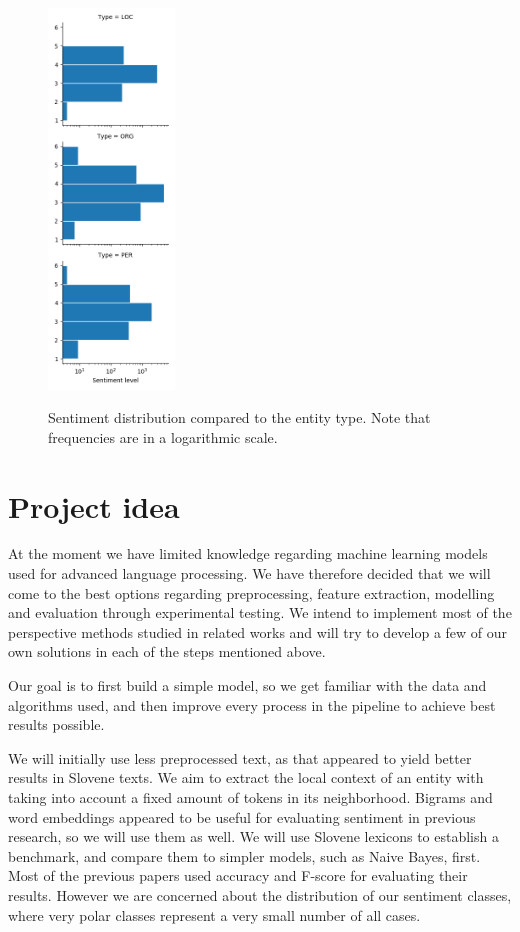 \documentclass[11pt,a4paper]{article}
\begin{document}
\begin{figure}[H]
\includegraphics[width=0.3\textwidth]{resources/sentiment_distributions.png}
\centering
\label{fig:sentiment-distribution}
\caption{Sentiment distribution compared to the entity type. Note that frequencies are in a logarithmic scale.}
\end{figure}

\section{Project idea}
At the moment we have limited knowledge regarding machine learning models used for advanced language processing. We have therefore decided that we will come to the best options regarding preprocessing, feature extraction, modelling and evaluation through experimental testing. We intend to implement most of the perspective methods studied in related works and will try to develop a few of our own solutions in each of the steps mentioned above.

Our goal is to first build a simple model, so we get familiar with the data and algorithms used, and then improve every process in the pipeline to achieve best results possible.

We will initially use less preprocessed text, as that appeared to yield better results in Slovene texts. We aim to extract the local context of an entity with taking into account a fixed amount of tokens in its neighborhood. Bigrams and word embeddings appeared to be useful for evaluating sentiment in previous research, so we will use them as well. We will use Slovene lexicons to establish a benchmark, and compare them to simpler models, such as Naive Bayes, first. Most of the previous papers used accuracy and F-score for evaluating their results. However we are concerned about the distribution of our sentiment classes, where very polar classes represent a very small number of all cases. 
\end{document}
